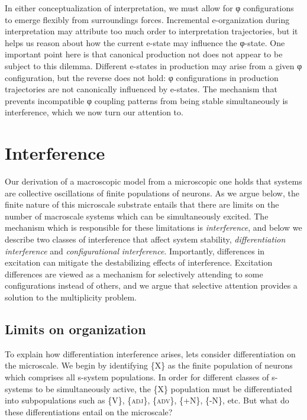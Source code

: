   In either conceptualization of interpretation, we must allow for φ configurations to emerge flexibly from surroundings forces. Incremental e-organization during interpretation may attribute too much order to interpretation trajectories, but it helps us reason about how the current e-state may influence the φ-state. One important point here is that canonical production not does not appear to be subject to this dilemma. Different e-states in production may arise from a given φ configuration, but the reverse does not hold: φ configurations in production trajectories are not canonically influenced by e-states. The mechanism that prevents incompatible φ coupling patterns from being stable simultaneously is interference, which we now turn our attention to.

\section{Interference}

Our derivation of a macroscopic model from a microscopic one holds that systems are collective oscillations of finite populations of neurons. As we argue below, the finite nature of this microscale substrate entails that there are limits on the number of macroscale systems which can be simultaneously excited. The mechanism which is responsible for these limitations is \textit{interference}, and below we describe two classes of interference that affect system stability, \textit{differentiation} \textit{interference} and \textit{configurational} \textit{interference}. Importantly, differences in excitation can mitigate the destabilizing effects of interference. Excitation differences are viewed as a mechanism for selectively attending to some configurations instead of others, and we argue that selective attention provides a solution to the multiplicity problem.

\subsection{Limits on organization}

To explain how differentiation interference arises, lets consider differentiation on the microscale. We begin by identifying \{X\} as the finite population of neurons which comprises all s-system populations. In order for different classes of s-systems to be simultaneously active, the \{X\} population must be differentiated into subpopulations such as \{V\}, \{\textsc{adj}\}, \{\textsc{adv}\}, \{+N\}, \{-N\}, etc. But what do these differentiations entail on the microscale?


